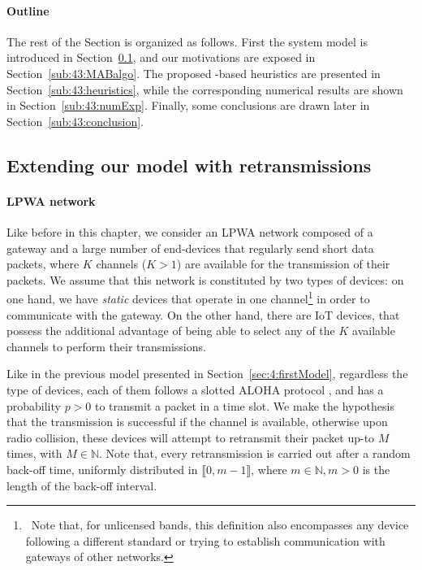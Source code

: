\paragraph{Outline}

The rest of the Section is organized as follows.
First the system model is introduced in Section~\ref{sub:43:model},
and our motivations are exposed in Section~\ref{sub:43:MABalgo}.
The proposed \UCB-based heuristics are presented in Section~\ref{sub:43:heuristics}, while the corresponding numerical results are shown in Section~\ref{sub:43:numExp}.
Finally, some conclusions are drawn later in Section~\ref{sub:43:conclusion}.


\subsection{Extending our model with retransmissions}
\label{sub:43:model}

\paragraph{LPWA network}

Like before in this chapter, we consider an LPWA network composed of a gateway and a large number of end-devices that regularly send short data packets, where $K$ channels ($K>1$) are available for the transmission of their packets.
%
We assume that this network is constituted by two types of devices:
on one hand, we have \emph{static} devices that operate in one channel\footnote{~Note that, for unlicensed bands, this definition also encompasses any device following a different standard or trying to establish communication with gateways of other networks.} in order to communicate with the gateway.
%
On the other hand, there are  IoT devices, that possess the additional advantage of being able to select any of the $K$ available channels to perform their transmissions.

Like in the previous model presented in Section~\ref{sec:4:firstModel},
regardless the type of devices, each of them follows a slotted ALOHA protocol \cite{Roberts75}, and has a probability $p>0$ to transmit a packet in a time slot.
We make the hypothesis that the transmission is successful if the channel is available, otherwise upon radio collision, these devices will attempt to retransmit their packet up-to $M$ times, with $M \in\mathbb{N}$.
Note that, every retransmission is carried out after a random back-off time, uniformly distributed in $\llbracket 0, m-1 \rrbracket$, where $m \in\mathbb{N}, m>0$ is the length of the back-off interval.



